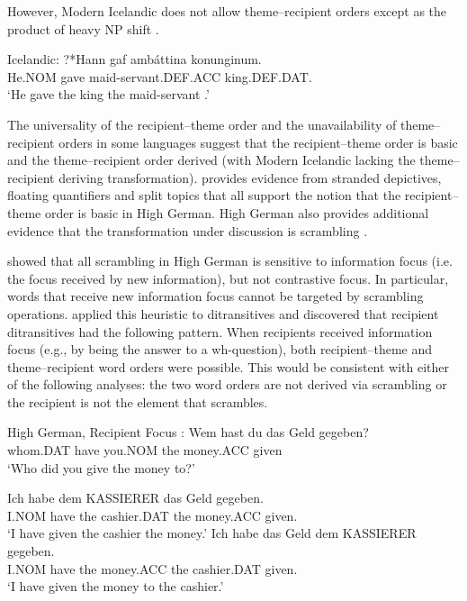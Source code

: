 	However, Modern Icelandic does not allow theme--recipient orders except as the product of heavy NP shift \citep{Dehe.2004}.

\begin{exe}
	\ex Icelandic:\label{ex:ice-tr}
\gll ?*Hann gaf amb\'attina konunginum.\\
He.NOM gave maid-servant.DEF.ACC king.DEF.DAT. \\
\trans `He gave the king the maid-servant \citep[ex 14b]{Dehe.2004}.'
\end{exe}

The universality of the recipient--theme order and the unavailability of theme--recipient orders in some languages suggest that the recipient--theme order is basic and the theme--recipient order derived (with Modern Icelandic lacking the theme--recipient deriving transformation). \cite{Georgala.2011} provides evidence from stranded depictives, floating quantifiers and split topics that all support the notion that the recipient--theme order is basic in High German. High German also provides additional evidence that the transformation under discussion is scrambling \citep{Lenerz.1977,Abraham.1986,Webelhuth.1992,Choi.1996}.

\cite{Lenerz.1977} showed that all scrambling in High German is sensitive to information focus (i.e. the focus received by new information), but not contrastive focus. In particular, words that receive new information focus cannot be targeted by scrambling operations. \cite{Lenerz.1977} applied this heuristic to ditransitives and discovered that recipient ditransitives had the following pattern. When recipients received information focus (e.g., by being the answer to a wh-question), both recipient--theme and theme--recipient word orders were possible. This would be consistent with either of the following analyses: the two word orders are not derived via scrambling or the recipient is not the element that scrambles.

\begin{exe}
	\ex High German, Recipient Focus \citep{Choi.1996}:\label{ex:hg-rec-focus}
\gll Wem hast du das Geld gegeben?\\
whom.DAT have you.NOM the money.ACC given\\
\trans `Who did you give the money to?'
\begin{xlist}
\ex \gll Ich habe dem KASSIERER das Geld gegeben.\\
I.NOM have the cashier.DAT the money.ACC given.\\
\trans `I have given the cashier the money.'
\ex \gll Ich habe das Geld dem KASSIERER gegeben.\\
I.NOM have the money.ACC the cashier.DAT given.\\
\trans `I have given the money to the cashier.'
\end{xlist}
\end{exe}


